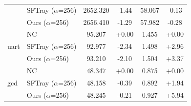 \begin{table}[t]
{\begin{tabular}{llcccc}
 & SFTray  ($\alpha$=256) & 2652.320 & -1.44 & 58.067 & -0.13 \\
 & Ours  ($\alpha$=256) & 2656.410 & -1.29 & 57.982 & -0.28 \\
\midrule
\multirow{3}{*}{uart} & NC & 95.207 & +0.00 & 1.455 & +0.00 \\
 & SFTray  ($\alpha$=256) & 92.977 & -2.34 & 1.498 & +2.96 \\
 & Ours  ($\alpha$=256) & 93.210 & -2.10 & 1.504 & +3.37 \\
\midrule
\multirow{3}{*}{gcd} & NC & 48.347 & +0.00 & 0.875 & +0.00 \\
 & SFTray  ($\alpha$=256) & 48.158 & -0.39 & 0.892 & +1.94 \\
 & Ours  ($\alpha$=256) & 48.245 & -0.21 & 0.927 & +5.94 \\
\midrule
\bottomrule
\end{tabular}
}
\end{table}